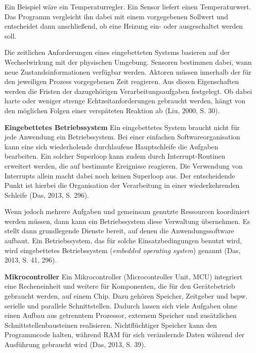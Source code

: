 Ein Beispiel w{\"a}re ein Temperaturregler. Ein Sensor liefert einen Temperaturwert. Das Programm vergleicht ihn dabei mit einem vorgegebenen Sollwert und entscheidet dann anschlie{\ss}end, ob eine Heizung ein- oder ausgeschaltet werden soll.

Die zeitlichen Anforderungen eines eingebetteten Systems basieren auf der Wechselwirkung mit der physischen Umgebung. Sensoren bestimmen dabei, wann neue Zustandsinformationen verf{\"u}gbar werden. Aktoren m{\"u}ssen innerhalb der f{\"u}r den jeweiligen Prozess vorgegebenen Zeit reagieren. Aus diesen Eigenschaften werden die Fristen der dazugeh{\"o}rigen Verarbeitungsaufgaben festgelegt. Ob dabei harte oder weniger strenge Echtzeitanforderungen gebraucht werden, h{\"a}ngt von den m{\"o}glichen Folgen einer versp{\"a}teten Reaktion ab (Liu, 2000, S. 30).

\textbf{Eingebettetes Betriebssystem }Ein eingebettetes System braucht nicht f{\"u}r jede Anwendung ein Betriebssystem. Bei einer einfachen Softwareorganisation kann eine sich wiederholende durchlaufene Hauptschleife die Aufgaben bearbeiten. Ein solcher Superloop kann zudem durch Interrupt-Routinen erweitert werden, die auf bestimmte Ereignisse reagieren. Die Verwendung von Interrupts allein macht dabei noch keinen Superloop aus. Der entscheidende Punkt ist hierbei die Organisation der Verarbeitung in einer wiederkehrenden Schleife (Das, 2013, S. 296).

Wenn jedoch mehrere Aufgaben und gemeinsam genutzte Ressourcen koordiniert werden m{\"u}ssen, dann kann ein Betriebssystem diese Verwaltung {\"u}bernehmen. Es stellt dann grundlegende Dienste bereit, auf denen die Anwendungssoftware aufbaut. Ein Betriebssystem, das f{\"u}r solche Einsatzbedingungen benutzt wird, wird eingebettetes Betriebssystem (\emph{embedded operating system}) genannt (Das, 2013, S. 41, 296).

\textbf{Mikrocontroller }Ein Mikrocontroller (Microcontroller Unit, MCU) integriert eine Recheneinheit und weitere f{\"u}r Komponenten, die f{\"u}r den Ger{\"a}tebetrieb gebraucht werden, auf einem Chip. Dazu geh{\"o}ren Speicher, Zeitgeber und bspw. serielle und parallele Schnittstellen. Dadurch lassen sich viele Aufgaben ohne einen Aufbau aus getrenntem Prozessor, externem Speicher und zus{\"a}tzlichen Schnittstellenbausteinen realisieren. Nichtfl{\"u}chtiger Speicher kann den Programmcode halten, w{\"a}hrend RAM f{\"u}r sich ver{\"a}ndernde Daten w{\"a}hrend der Ausf{\"u}hrung gebraucht wird (Das, 2013, S. 39).

